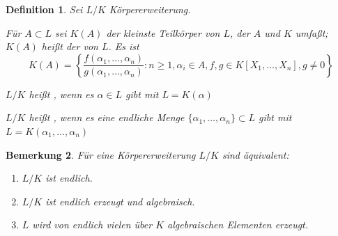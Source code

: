 \documentclass[a4paper,10pt,german]{scrbook}
\theoremstyle{saetze}
\theoremstyle{definitionen}
\newtheorem{Def}{Definition}[section]
\newtheorem{Bem}[Def]{Bemerkung}
\begin{document}
\begin{Def}
Sei $L/K$ Körpererweiterung.
\begin{enum}
\item Für $A \subset L$ sei $K(A)$ der kleinste Teilkörper von $L$,
der $A$ und $K$ umfaßt; $K(A)$ heißt der  von $L$. Es ist
\[ K(A) = \left\{
\frac{f(\alpha_1,\dots,\alpha_n)}{g(\alpha_1,\dots,\alpha_n)} : n
\geq 1, \alpha_i \in A, f, g \in K[X_1,\dots,X_n], g \neq 0 \right\} \]

\item $L/K$ heißt , wenn es $\alpha \in L$ gibt mit $L
= K(\alpha)$

\item $L/K$ heißt , wenn es eine endliche Menge
$\{\alpha_1,\dots,\alpha_n\} \subset L$ gibt mit $L =
K(\alpha_1,\dots,\alpha_n)$
\end{enum}
\end{Def}

\begin{Bem}
\label{3.4}
Für eine Körpererweiterung $L/K$ sind
äquivalent:
\begin{enumerate}
\item[(i)] $L/K$ ist endlich.
\item[(ii)] $L/K$ ist endlich erzeugt und algebraisch.
\item[(iii)] $L$ wird von endlich vielen über $K$ algebraischen
Elementen erzeugt.
\end{enumerate}

\end{Bem}
\end{document}

